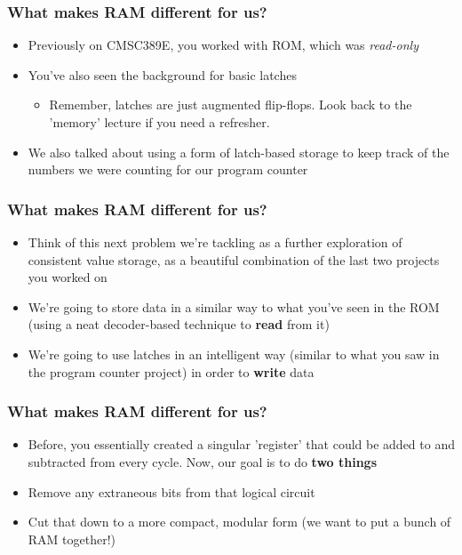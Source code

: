 \documentclass{beamer}
\begin{document}
             \begin{frame}
             	\frametitle{What makes RAM different for us?}
             	\begin{itemize}
             		\item Previously on CMSC389E, you worked with ROM, which was \textit{read-only}
             		\item You've also seen the background for basic latches
             		\begin{itemize}
             			\item Remember, latches are just augmented flip-flops. Look back to the 'memory' lecture if you need a refresher.
             		\end{itemize}
             		\item We also talked about using a form of latch-based storage to keep track of the numbers we were counting for our program counter
             		
             	\end{itemize}
             	
             \end{frame}
             
             \begin{frame}
             	\frametitle{What makes RAM different for us?}
             	\begin{itemize}
             		\item Think of this next problem we're tackling as a further exploration of consistent value storage, as a beautiful combination of the last two projects you worked on
             		\item We're going to store data in a similar way to what you've seen in the ROM (using a neat decoder-based technique to \textbf{read} from it)
             		\item We're going to use latches in an intelligent way (similar to what you saw in the program counter project) in order to \textbf{write} data
             	\end{itemize}
             \end{frame}
             
             \begin{frame}
             	\frametitle{What makes RAM different for us?}
             	\begin{itemize}
             		\item Before, you essentially created a singular 'register' that could be added to and subtracted from every cycle. Now, our goal is to do \textbf{two things}
             		\item Remove any extraneous bits from that logical circuit
             		\item Cut that down to a more compact, modular form (we want to put a bunch of RAM together!)
             	\end{itemize}
             \end{frame}
             
\end{document}
